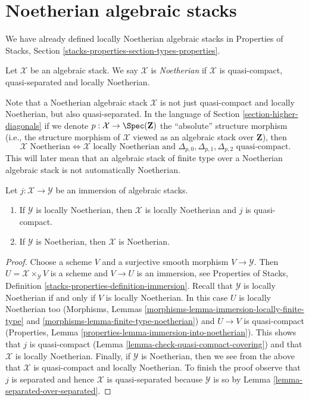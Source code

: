 \section{Noetherian algebraic stacks}
\label{section-noetherian}

\noindent
We have already defined locally Noetherian algebraic stacks in
Properties of Stacks, Section \ref{stacks-properties-section-types-properties}.

\begin{definition}
\label{definition-noetherian}
Let $\mathcal{X}$ be an algebraic stack. We say $\mathcal{X}$ is
{\it Noetherian} if $\mathcal{X}$ is quasi-compact, quasi-separated
and locally Noetherian.
\end{definition}

\noindent
Note that a Noetherian algebraic stack $\mathcal{X}$ is not just quasi-compact
and locally Noetherian, but also quasi-separated. In the language of
Section \ref{section-higher-diagonals}
if we denote $p : \mathcal{X} \to \Spec(\mathbf{Z})$ the
``absolute'' structure morphism (i.e., the structure morphism of
$\mathcal{X}$ viewed as an algebraic stack over $\mathbf{Z}$), then
$$
\mathcal{X}\text{ Noetherian}
\Leftrightarrow
\mathcal{X}\text{ locally Noetherian and }
\Delta_{p, 0}, \Delta_{p, 1}, \Delta_{p, 2}
\text{ quasi-compact}.
$$
This will later mean that an algebraic stack of finite type over a
Noetherian algebraic stack is not automatically Noetherian.

\begin{lemma}
\label{lemma-locally-closed-in-noetherian}
Let $j : \mathcal{X} \to \mathcal{Y}$ be an immersion of algebraic stacks.
\begin{enumerate}
\item If $\mathcal{Y}$ is locally Noetherian, then
$\mathcal{X}$ is locally Noetherian and $j$ is quasi-compact.
\item If $\mathcal{Y}$ is Noetherian, then $\mathcal{X}$ is Noetherian.
\end{enumerate}
\end{lemma}

\begin{proof}
Choose a scheme $V$ and a surjective smooth morphism $V \to \mathcal{Y}$.
Then $U = \mathcal{X} \times_\mathcal{Y} V$ is a scheme and
$V \to U$ is an immersion, see
Properties of Stacks, Definition \ref{stacks-properties-definition-immersion}.
Recall that $\mathcal{Y}$ is locally Noetherian if and only if $V$
is locally Noetherian. In this case $U$ is locally Noetherian too
(Morphisms, Lemmas \ref{morphisms-lemma-immersion-locally-finite-type} and
\ref{morphisms-lemma-finite-type-noetherian}) and $U \to V$ is quasi-compact
(Properties, Lemma \ref{properties-lemma-immersion-into-noetherian}).
This shows that $j$ is quasi-compact
(Lemma \ref{lemma-check-quasi-compact-covering})
and that $\mathcal{X}$ is locally Noetherian.
Finally, if $\mathcal{Y}$ is Noetherian, then we see from the above
that $\mathcal{X}$ is quasi-compact and locally Noetherian.
To finish the proof observe that $j$ is separated and hence
$\mathcal{X}$ is quasi-separated because $\mathcal{Y}$ is so by
Lemma \ref{lemma-separated-over-separated}.
\end{proof}

